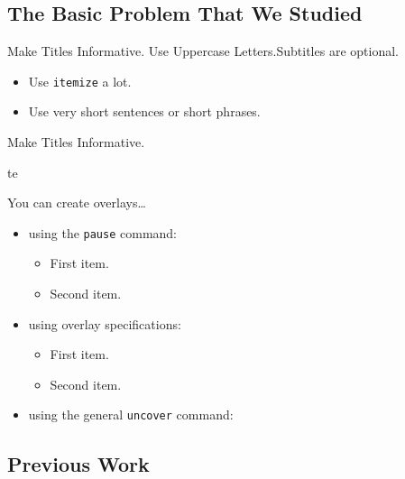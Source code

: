 \documentclass[aspectratio=169]{beamer}
\newcommand{\1}{\mathbf{1}}
\newcommand{\0}{\mathbf{0}}
\begin{document}
\subsection{The Basic Problem That We Studied}

\begin{frame}{Make Titles Informative. Use Uppercase Letters.}{Subtitles are optional.}

  \begin{itemize}
  \item
    Use \texttt{itemize} a lot.
  \item
    Use very short sentences or short phrases.
  \end{itemize}
\end{frame}

\begin{frame}{Make Titles Informative.}
  \begin{block}{te}

  \end{block}
  You can create overlays\dots
  \begin{itemize}
  \item using the \texttt{pause} command:
    \begin{itemize}
    \item
      First item.
      \pause
    \item
      Second item.
    \end{itemize}
  \item
    using overlay specifications:
    \begin{itemize}
    \item<3->
      First item.
    \item<4->
      Second item.
    \end{itemize}
  \item
    using the general \texttt{uncover} command:
    \begin{itemize}
    \end{itemize}
  \end{itemize}
\end{frame}


\subsection{Previous Work}
\end{document}
